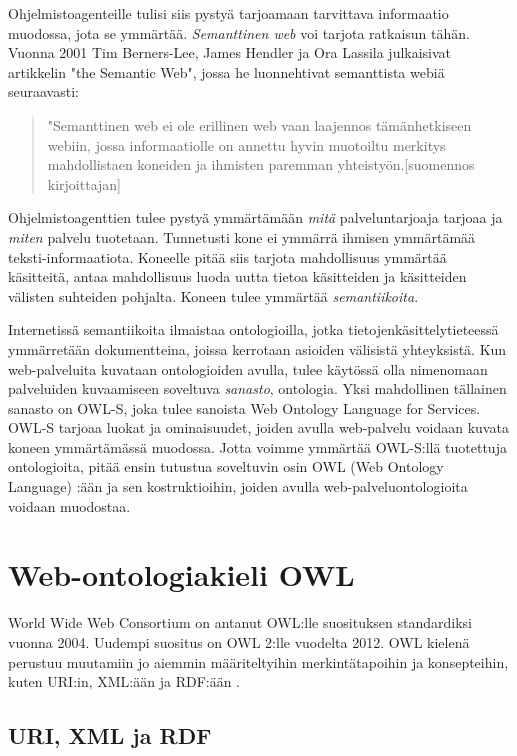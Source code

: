 \documentclass[finnish]{tktltiki2}
\theoremstyle{definition}
\theoremstyle{remark}
\begin{document}
Ohjelmistoagenteille tulisi siis pystyä tarjoamaan tarvittava informaatio muodossa, jota se ymmärtää. \textit{Semanttinen web} voi tarjota ratkaisun tähän. Vuonna 2001 Tim Berners-Lee, James Hendler ja Ora Lassila julkaisivat artikkelin "the Semantic Web", jossa he
luonnehtivat semanttista webiä seuraavasti:
\begin{quote}
"Semanttinen web ei ole erillinen web vaan
laajennos tämänhetkiseen webiin, jossa informaatiolle on annettu hyvin muotoiltu
merkitys mahdollistaen koneiden ja ihmisten paremman yhteistyön.[suomennos kirjoittajan]\cite{semweb}
\end{quote}

Ohjelmistoagenttien tulee pystyä ymmärtämään \textit{mitä} palveluntarjoaja tarjoaa ja \textit{miten} palvelu tuotetaan. Tunnetusti kone ei ymmärrä ihmisen ymmärtämää teksti-informaatiota. Koneelle pitää siis tarjota mahdollisuus ymmärtää käsitteitä, antaa mahdollisuus luoda uutta tietoa käsitteiden ja käsitteiden välisten suhteiden pohjalta. Koneen tulee ymmärtää \textit{semantiikoita}. 

Internetissä semantiikoita ilmaistaa ontologioilla, jotka tietojenkäsittelytieteessä ymmärretään dokumentteina, joissa kerrotaan asioiden välisistä yhteyksistä\cite{semweb}. Kun web-palveluita kuvataan ontologioiden avulla, tulee käytössä olla nimenomaan palveluiden kuvaamiseen soveltuva \textit{sanasto}, ontologia. Yksi mahdollinen tällainen sanasto on OWL-S, joka tulee sanoista Web Ontology Language for Services. OWL-S tarjoaa luokat ja ominaisuudet, joiden avulla web-palvelu voidaan kuvata koneen ymmärtämässä muodossa\cite{OWL}. Jotta voimme ymmärtää OWL-S:llä tuotettuja ontologioita, pitää ensin tutustua soveltuvin osin OWL (Web Ontology Language) :ään ja sen kostruktioihin, joiden avulla web-palveluontologioita voidaan muodostaa. 

\section{Web-ontologiakieli OWL}

World Wide Web Consortium on antanut OWL:lle suosituksen standardiksi vuonna 2004\cite{owlguide}. Uudempi suositus on OWL 2:lle vuodelta 2012. OWL kielenä perustuu muutamiin jo aiemmin määriteltyihin merkintätapoihin ja konsepteihin, kuten URI:in, XML:ään ja RDF:ään .

\subsection{URI, XML ja RDF}
\end{document}
